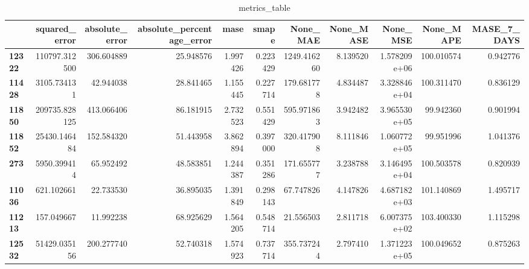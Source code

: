 \begin{table}[h]
\centering
\caption{metrics_table}
\label{table:Experiment with CNN AE and LSTM hybrid method. Global, univariate, dataset seasonal. Tuned with LSTM Local Global dataset seasonal}
\begin{tabular}{lrrrrrrrrrr}
\toprule
{} &  squared\_error &  absolute\_error &  absolute\_percentage\_error &      mase &     smape &     None\_MAE &  None\_MASE &      None\_MSE &   None\_MAPE &  MASE\_7\_DAYS \\
\midrule
\textbf{12322} &  110797.312500 &      306.604889 &                  25.948576 &  1.997426 &  0.223429 &  1249.416260 &   8.139520 &  1.578209e+06 &  100.010574 &     0.942776 \\
\textbf{11428} &    3105.734131 &       42.944038 &                  28.841465 &  1.155445 &  0.227714 &   179.681778 &   4.834487 &  3.328846e+04 &  100.311470 &     0.836129 \\
\textbf{11850} &  209735.828125 &      413.066406 &                  86.181915 &  2.732523 &  0.551429 &   595.971863 &   3.942482 &  3.965530e+05 &   99.942360 &     0.901994 \\
\textbf{11852} &   25430.146484 &      152.584320 &                  51.443958 &  3.862894 &  0.397000 &   320.417908 &   8.111846 &  1.060772e+05 &   99.951996 &     1.041376 \\
\textbf{273  } &    5950.399414 &       65.952492 &                  48.583851 &  1.244387 &  0.351286 &   171.655777 &   3.238788 &  3.146495e+04 &  100.503578 &     0.820939 \\
\textbf{11036} &     621.102661 &       22.733530 &                  36.895035 &  1.391849 &  0.298143 &    67.747826 &   4.147826 &  4.687182e+03 &  101.140869 &     1.495717 \\
\textbf{11213} &     157.049667 &       11.992238 &                  68.925629 &  1.564205 &  0.548714 &    21.556503 &   2.811718 &  6.007375e+02 &  103.400330 &     1.115298 \\
\textbf{12532} &   51429.035156 &      200.277740 &                  52.740318 &  1.574923 &  0.737714 &   355.737244 &   2.797410 &  1.371223e+05 &  100.049652 &     0.875263 \\
\bottomrule
\end{tabular}
\end{table}
